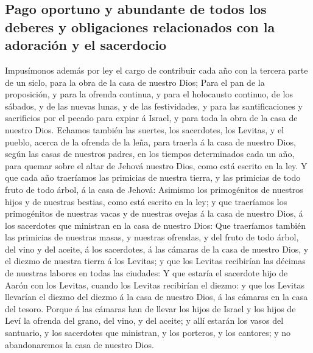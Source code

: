 \hypertarget{pago-oportuno-y-abundante-de-todos-los-deberes-y-obligaciones-relacionados-con-la-adoraciuxf3n-y-el-sacerdocio}{%
\subsection{Pago oportuno y abundante de todos los deberes y
obligaciones relacionados con la adoración y el
sacerdocio}\label{pago-oportuno-y-abundante-de-todos-los-deberes-y-obligaciones-relacionados-con-la-adoraciuxf3n-y-el-sacerdocio}}

 Impusímonos además por ley el cargo de contribuir cada
año con la tercera parte de un siclo, para la obra de la casa de nuestro
Dios;  Para el pan de la proposición, y para la ofrenda
continua, y para el holocausto continuo, de los sábados, y de las nuevas
lunas, y de las festividades, y para las santificaciones y sacrificios
por el pecado para expiar á Israel, y para toda la obra de la casa de
nuestro Dios.  Echamos también las suertes, los
sacerdotes, los Levitas, y el pueblo, acerca de la ofrenda de la leña,
para traerla á la casa de nuestro Dios, según las casas de nuestros
padres, en los tiempos determinados cada un año, para quemar sobre el
altar de Jehová nuestro Dios, como está escrito en la ley.
 Y que cada año traeríamos las primicias de nuestra
tierra, y las primicias de todo fruto de todo árbol, á la casa de
Jehová:  Asimismo los primogénitos de nuestros hijos y de
nuestras bestias, como está escrito en la ley; y que traeríamos los
primogénitos de nuestras vacas y de nuestras ovejas á la casa de nuestro
Dios, á los sacerdotes que ministran en la casa de nuestro Dios:
 Que traeríamos también las primicias de nuestras masas,
y nuestras ofrendas, y del fruto de todo árbol, del vino y del aceite, á
los sacerdotes, á las cámaras de la casa de nuestro Dios, y el diezmo de
nuestra tierra á los Levitas; y que los Levitas recibirían las décimas
de nuestras labores en todas las ciudades:  Y que estaría
el sacerdote hijo de Aarón con los Levitas, cuando los Levitas
recibirían el diezmo: y que los Levitas llevarían el diezmo del diezmo á
la casa de nuestro Dios, á las cámaras en la casa del tesoro.
 Porque á las cámaras han de llevar los hijos de Israel y
los hijos de Leví la ofrenda del grano, del vino, y del aceite; y allí
estarán los vasos del santuario, y los sacerdotes que ministran, y los
porteros, y los cantores; y no abandonaremos la casa de nuestro Dios.

